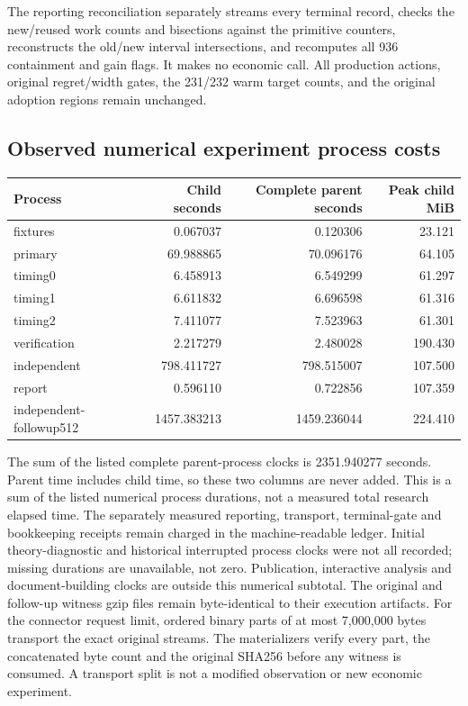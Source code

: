 The reporting reconciliation separately streams every terminal record, checks the new/reused work counts and bisections against the primitive counters, reconstructs the old/new interval intersections, and recomputes all 936 containment and gain flags. It makes no economic call. All production actions, original regret/width gates, the 231/232 warm target counts, and the original adoption regions remain unchanged.
\subsection{Observed numerical experiment process costs}
\begin{center}\small
\begin{tabular}{lrrr}
\hline
Process & Child seconds & Complete parent seconds & Peak child MiB \\
\hline
fixtures & 0.067037 & 0.120306 & 23.121 \\
primary & 69.988865 & 70.096176 & 64.105 \\
timing0 & 6.458913 & 6.549299 & 61.297 \\
timing1 & 6.611832 & 6.696598 & 61.316 \\
timing2 & 7.411077 & 7.523963 & 61.301 \\
verification & 2.217279 & 2.480028 & 190.430 \\
independent & 798.411727 & 798.515007 & 107.500 \\
report & 0.596110 & 0.722856 & 107.359 \\
independent-followup512 & 1457.383213 & 1459.236044 & 224.410 \\
\hline\end{tabular}
\end{center}
The sum of the listed complete parent-process clocks is 2351.940277 seconds. Parent time includes child time, so these two columns are never added. This is a sum of the listed numerical process durations, not a measured total research elapsed time. The separately measured reporting, transport, terminal-gate and bookkeeping receipts remain charged in the machine-readable ledger. Initial theory-diagnostic and historical interrupted process clocks were not all recorded; missing durations are unavailable, not zero. Publication, interactive analysis and document-building clocks are outside this numerical subtotal.
The original and follow-up witness gzip files remain byte-identical to their execution artifacts. For the connector request limit, ordered binary parts of at most 7,000,000 bytes transport the exact original streams. The materializers verify every part, the concatenated byte count and the original SHA256 before any witness is consumed. A transport split is not a modified observation or new economic experiment.
